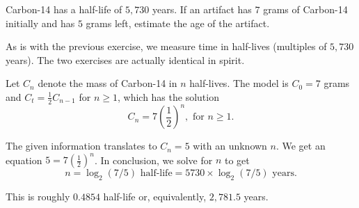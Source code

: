 \documentclass[../main.tex]{subfiles}
\begin{document}
\begin{exercise}
  Carbon-14 has a half-life of \(5,730\) years. If an artifact has \(7\) grams of Carbon-14 initially and has \(5\) grams left, estimate the age of the artifact.

  \begin{solution}
    As is with the previous exercise, we measure time in half-lives (multiples of \(5,730\) years). The two exercises are actually identical in spirit.

    Let \(C_{n}\) denote the mass of Carbon-14 in \(n\) half-lives.  The model is \(C_{0} = 7\) grams and \(C_{t} = \frac{1}{2}C_{n-1}\) for \(n \ge 1\), which has the solution
    \[
      C_{n} = 7 \left( \frac{1}{2} \right)^{n}, \text{ for } n \ge 1.
    \]

    The given information translates to \(C_{n} = 5\) with an unknown \(n\).  We get an equation \(5 = 7 \left( \frac{1}{2} \right)^{n}\). In conclusion, we solve for \(n\) to get
    \[
      n = \log_{2}(7/5) \text{ half-life} = 5730 \times \log_{2}(7/5) \text{ years}. 
    \]

    This is roughly \(0.4854\) half-life or, equivalently, \(2,781.5\) years.

  \end{solution}
\end{exercise}
\end{document}
